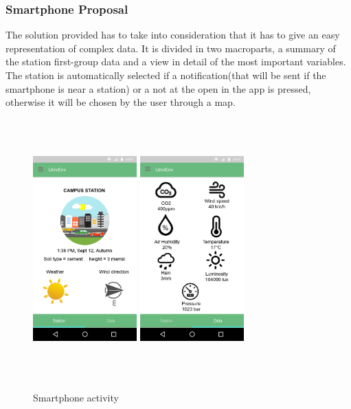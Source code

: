 \documentclass[12pt]{article} %
\begin{document}
\subsubsection{Smartphone Proposal}
The solution provided has to take into consideration that it has to give an easy representation of complex data. It is divided in two macroparts, a summary of the station first-group data and a view in detail of the most important variables.
The station is automatically selected if a notification(that will be sent if the smartphone is near a station) or a not at the open in the app is pressed, otherwise it will be chosen by the user through a map.


\begin{figure}[H]
  \centering
  \includegraphics[width=4cm,height=10cm,keepaspectratio]{img/station.png}
  \hspace{0.1\textwidth}
  \includegraphics[width=4cm,height=10cm,keepaspectratio]{img/data.png}
  \hfill
  \caption{Smartphone activity}
  \label{fig:boat1}
\end{figure}
\end{document}
